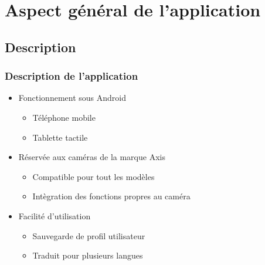\documentclass{beamer}
\begin{document}
\section{Aspect général de l'application}
  \subsection{Description}
  \begin{frame}
   \frametitle{Description de l'application}
   \begin{itemize}
   \item Fonctionnement sous Android
       \begin{itemize}
    	\item Téléphone mobile
   		\item Tablette tactile
    	\end{itemize}
   \item Réservée aux caméras de la marque Axis
   		\begin{itemize}
    	\item Compatible pour tout les modèles
   		\item Intègration des fonctions propres au caméra
    	\end{itemize}
   \item Facilité d'utilisation
   		\begin{itemize}
    	\item Sauvegarde de profil utilisateur
   		\item Traduit pour plusieurs langues
    	\end{itemize}
   \end{itemize}
  \end{frame}


\end{document}
